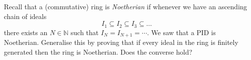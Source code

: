 \documentclass[answers]{exam}
\begin{document}
\begin{questions}



\question%
Recall that a (commutative) ring is \emph{Noetherian} if whenever we have an ascending chain of ideals \[
	I_{1} \subseteq I_{2} \subseteq I_{3} \subseteq \ldots
\] there exists an $N \in \mathbb{N}$ such that $I_{N}=I_{N+1}=\cdots$. We saw that a PID is Noetherian. Generalise this by proving that if every ideal in the ring is finitely generated then the ring is Noetherian. Does the converse hold?

\end{questions}
\end{document}
